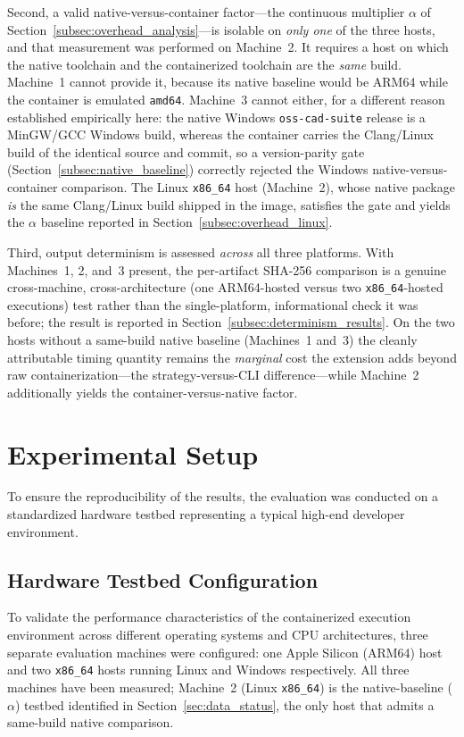 Second, a valid native-versus-container factor---the continuous multiplier $\alpha$ of Section~\ref{subsec:overhead_analysis}---is isolable on \emph{only one} of the three hosts, and that measurement was performed on Machine~2. It requires a host on which the native toolchain and the containerized toolchain are the \emph{same} build. Machine~1 cannot provide it, because its native baseline would be ARM64 while the container is emulated \texttt{amd64}. Machine~3 cannot either, for a different reason established empirically here: the native Windows \texttt{oss-cad-suite} release is a MinGW/GCC Windows build, whereas the container carries the Clang/Linux build of the identical source and commit, so a version-parity gate (Section~\ref{subsec:native_baseline}) correctly rejected the Windows native-versus-container comparison. The Linux \texttt{x86\_64} host (Machine~2), whose native package \emph{is} the same Clang/Linux build shipped in the image, satisfies the gate and yields the $\alpha$ baseline reported in Section~\ref{subsec:overhead_linux}.

Third, output determinism is assessed \emph{across} all three platforms. With Machines~1, 2, and~3 present, the per-artifact SHA-256 comparison is a genuine cross-machine, cross-architecture (one ARM64-hosted versus two \texttt{x86\_64}-hosted executions) test rather than the single-platform, informational check it was before; the result is reported in Section~\ref{subsec:determinism_results}. On the two hosts without a same-build native baseline (Machines~1 and~3) the cleanly attributable timing quantity remains the \emph{marginal} cost the extension adds beyond raw containerization---the strategy-versus-CLI difference---while Machine~2 additionally yields the container-versus-native factor.

\section{Experimental Setup}
To ensure the reproducibility of the results, the evaluation was conducted on a standardized hardware testbed representing a typical high-end developer environment.

\subsection{Hardware Testbed Configuration}
To validate the performance characteristics of the containerized execution environment across different operating systems and CPU architectures, three separate evaluation machines were configured: one Apple Silicon (ARM64) host and two \texttt{x86\_64} hosts running Linux and Windows respectively. All three machines have been measured; Machine~2 (Linux \texttt{x86\_64}) is the native-baseline ($\alpha$) testbed identified in Section~\ref{sec:data_status}, the only host that admits a same-build native comparison.

